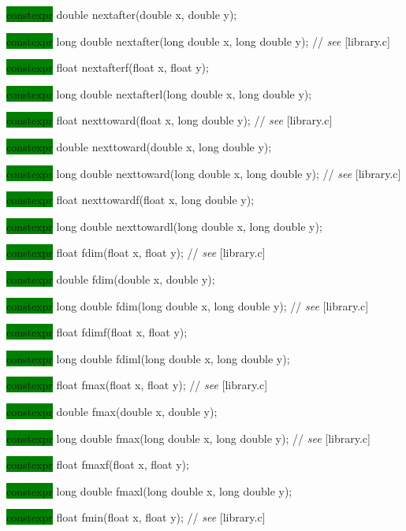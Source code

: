 \documentclass[prd,twocolumn,amsmath,amssymb,nofootinbib,eqsecnum]{revtex4-1}
\newcommand{\highlight}[1]{\colorbox{green}{\!\!\!\! #1}}
\newcommand{\stdcomment}[1]{{// {\it see} [#1]}}
\begin{document}
{\highlight{constexpr}  double nextafter(double x, double y);

\highlight{constexpr}  long double nextafter(long double x, long double y); \stdcomment{library.c}

\highlight{constexpr}  float nextafterf(float x, float y);

\highlight{constexpr}  long double nextafterl(long double x, long double y);

\vspace{2ex}

\highlight{constexpr}  float nexttoward(float x, long double y); \stdcomment{library.c}

\highlight{constexpr}  double nexttoward(double x, long double y);

\highlight{constexpr}  long double nexttoward(long double x, long double y); \stdcomment{library.c}

\highlight{constexpr}  float nexttowardf(float x, long double y);

\highlight{constexpr}  long double nexttowardl(long double x, long double y);

\vspace{2ex}

\highlight{constexpr}  float fdim(float x, float y); \stdcomment{library.c}

\highlight{constexpr}  double fdim(double x, double y);

\highlight{constexpr}  long double fdim(long double x, long double y); \stdcomment{library.c}

\highlight{constexpr}  float fdimf(float x, float y);

\highlight{constexpr}  long double fdiml(long double x, long double y);

\vspace{2ex}

\highlight{constexpr}  float fmax(float x, float y); \stdcomment{library.c}

\highlight{constexpr}  double fmax(double x, double y);

\highlight{constexpr}  long double fmax(long double x, long double y); \stdcomment{library.c}

\highlight{constexpr}  float fmaxf(float x, float y);

\highlight{constexpr}  long double fmaxl(long double x, long double y);

\vspace{2ex}

\highlight{constexpr} float fmin(float x, float y); \stdcomment{library.c}

}
\end{document}
